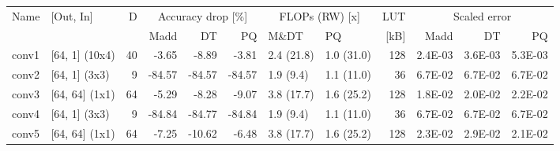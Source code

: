 \begin{table}
\centering
\begin{tabular}{llrrrrllrrrr}
\toprule
Name & [Out, In] & D & \multicolumn{3}{|c|}{Accuracy drop [\%]} & \multicolumn{2}{|c|}{FLOPs (RW) [x]} & LUT & \multicolumn{3}{|c|}{Scaled error} \\
 &  &  & Madd & DT & PQ & M\&DT & PQ & [kB] & Madd & DT & PQ \\
\midrule
conv1 & [64, 1] (10x4) & 40 & {\cellcolor[HTML]{F1F9AC}} \color[HTML]{000000} -3.65 & {\cellcolor[HTML]{FEFFBE}} \color[HTML]{000000} -8.89 & {\cellcolor[HTML]{F2FAAE}} \color[HTML]{000000} -3.81 & 2.4 (21.8) & 1.0 (31.0) & 128 & {\cellcolor[HTML]{B7E075}} \color[HTML]{000000} 2.4E-03 & {\cellcolor[HTML]{BDE379}} \color[HTML]{000000} 3.6E-03 & {\cellcolor[HTML]{C5E67E}} \color[HTML]{000000} 5.3E-03 \\
conv2 & [64, 1] (3x3) & 9 & {\cellcolor[HTML]{A50026}} \color[HTML]{F1F1F1} -84.57 & {\cellcolor[HTML]{A50026}} \color[HTML]{F1F1F1} -84.57 & {\cellcolor[HTML]{A50026}} \color[HTML]{F1F1F1} -84.57 & 1.9 (9.4) & 1.1 (11.0) & 36 & {\cellcolor[HTML]{B30D26}} \color[HTML]{F1F1F1} 6.7E-02 & {\cellcolor[HTML]{B30D26}} \color[HTML]{F1F1F1} 6.7E-02 & {\cellcolor[HTML]{B30D26}} \color[HTML]{F1F1F1} 6.7E-02 \\
conv3 & [64, 64] (1x1) & 64 & {\cellcolor[HTML]{F5FBB2}} \color[HTML]{000000} -5.29 & {\cellcolor[HTML]{FDFEBC}} \color[HTML]{000000} -8.28 & {\cellcolor[HTML]{FFFEBE}} \color[HTML]{000000} -9.07 & 3.8 (17.7) & 1.6 (25.2) & 128 & {\cellcolor[HTML]{F8FCB6}} \color[HTML]{000000} 1.8E-02 & {\cellcolor[HTML]{FFFEBE}} \color[HTML]{000000} 2.0E-02 & {\cellcolor[HTML]{FFF7B2}} \color[HTML]{000000} 2.2E-02 \\
conv4 & [64, 1] (3x3) & 9 & {\cellcolor[HTML]{A50026}} \color[HTML]{F1F1F1} -84.84 & {\cellcolor[HTML]{A50026}} \color[HTML]{F1F1F1} -84.77 & {\cellcolor[HTML]{A50026}} \color[HTML]{F1F1F1} -84.84 & 1.9 (9.4) & 1.1 (11.0) & 36 & {\cellcolor[HTML]{B71126}} \color[HTML]{F1F1F1} 6.7E-02 & {\cellcolor[HTML]{B71126}} \color[HTML]{F1F1F1} 6.7E-02 & {\cellcolor[HTML]{B71126}} \color[HTML]{F1F1F1} 6.7E-02 \\
conv5 & [64, 64] (1x1) & 64 & {\cellcolor[HTML]{FBFDBA}} \color[HTML]{000000} -7.25 & {\cellcolor[HTML]{FFFCBA}} \color[HTML]{000000} -10.62 & {\cellcolor[HTML]{F8FCB6}} \color[HTML]{000000} -6.48 & 3.8 (17.7) & 1.6 (25.2) & 128 & {\cellcolor[HTML]{FFF5AE}} \color[HTML]{000000} 2.3E-02 & {\cellcolor[HTML]{FEE28F}} \color[HTML]{000000} 2.9E-02 & {\cellcolor[HTML]{FFFAB6}} \color[HTML]{000000} 2.1E-02 \\

\end{tabular}
\end{table}
